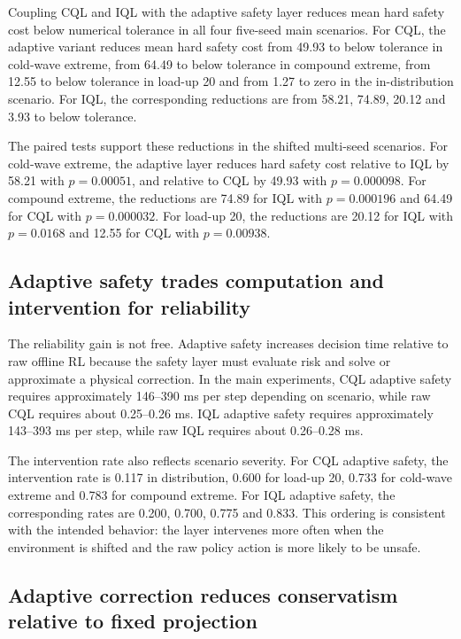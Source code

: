 \documentclass[preprint,12pt]{elsarticle}
\begin{document}
Coupling CQL and IQL with the adaptive safety layer reduces mean hard safety cost below numerical tolerance in all four five-seed main scenarios. For CQL, the adaptive variant reduces mean hard safety cost from 49.93 to below tolerance in cold-wave extreme, from 64.49 to below tolerance in compound extreme, from 12.55 to below tolerance in load-up 20 and from 1.27 to zero in the in-distribution scenario. For IQL, the corresponding reductions are from 58.21, 74.89, 20.12 and 3.93 to below tolerance.



The paired tests support these reductions in the shifted multi-seed scenarios. For cold-wave extreme, the adaptive layer reduces hard safety cost relative to IQL by 58.21 with $p=0.00051$, and relative to CQL by 49.93 with $p=0.000098$. For compound extreme, the reductions are 74.89 for IQL with $p=0.000196$ and 64.49 for CQL with $p=0.000032$. For load-up 20, the reductions are 20.12 for IQL with $p=0.0168$ and 12.55 for CQL with $p=0.00938$.

\subsection{Adaptive safety trades computation and intervention for reliability}

The reliability gain is not free. Adaptive safety increases decision time relative to raw offline RL because the safety layer must evaluate risk and solve or approximate a physical correction. In the main experiments, CQL adaptive safety requires approximately 146--390 ms per step depending on scenario, while raw CQL requires about 0.25--0.26 ms. IQL adaptive safety requires approximately 143--393 ms per step, while raw IQL requires about 0.26--0.28 ms.

The intervention rate also reflects scenario severity. For CQL adaptive safety, the intervention rate is 0.117 in distribution, 0.600 for load-up 20, 0.733 for cold-wave extreme and 0.783 for compound extreme. For IQL adaptive safety, the corresponding rates are 0.200, 0.700, 0.775 and 0.833. This ordering is consistent with the intended behavior: the layer intervenes more often when the environment is shifted and the raw policy action is more likely to be unsafe.

\subsection{Adaptive correction reduces conservatism relative to fixed projection}
\end{document}
